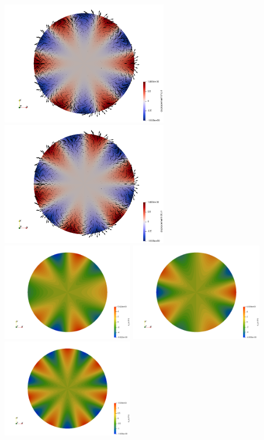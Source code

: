 \begin{center}
\includegraphics[width=7.2cm]{python_codes/fieldstone_111/results/n3_k5/u}
\includegraphics[width=7.2cm]{python_codes/fieldstone_111/results/n3_k5/v}\\
\includegraphics[width=5.7cm]{python_codes/fieldstone_111/results/n3_k5/e_xx}
\includegraphics[width=5.7cm]{python_codes/fieldstone_111/results/n3_k5/e_yy}
\includegraphics[width=5.7cm]{python_codes/fieldstone_111/results/n3_k5/e_xy}\\

\end{center}
